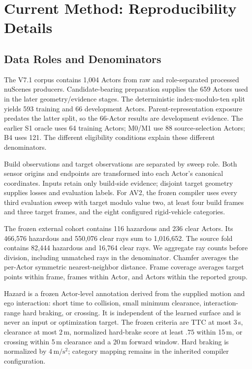\section{Current Method: Reproducibility Details}
\label{sec:archive-repro}

\subsection{Data Roles and Denominators}

The V7.1 corpus contains 1,004 Actors from raw and role-separated processed nuScenes producers.
Candidate-bearing preparation supplies the 659 Actors used in the later geometry/evidence stages.
The deterministic index-modulo-ten split yields 593 training and 66 development Actors.
Parent-representation exposure predates the latter split, so the 66-Actor results are development evidence.
The earlier S1 oracle uses 64 training Actors; M0/M1 use 88 source-selection Actors; B4 uses 121.
The different eligibility conditions explain these different denominators.

Build observations and target observations are separated by sweep role. Both sensor origins and endpoints
are transformed into each Actor's canonical coordinates.
Inputs retain only build-side evidence; disjoint target geometry supplies losses and evaluation labels.
For AV2, the frozen compiler uses every third evaluation sweep with target modulo value two,
at least four build frames and three target frames, and the eight configured rigid-vehicle categories.

The frozen external cohort contains 116 hazardous and 236 clear Actors.
Its 466,576 hazardous and 550,076 clear rays sum to 1,016,652.
The source fold contains 82,444 hazardous and 16,764 clear rays.
We aggregate ray counts before division, including unmatched rays in the denominator.
Chamfer averages the per-Actor symmetric nearest-neighbor distance.
Frame coverage averages target points within frame, frames within Actor, and Actors within the reported group.

Hazard is a frozen Actor-level annotation derived from the supplied motion and ego interaction:
short time to collision, small minimum clearance, interaction-range hard braking, or crossing.
It is independent of the learned surface and is never an input or optimization target.
The frozen criteria are TTC at most 3\,s, clearance at most 2\,m, normalized hard-brake score at least
$.75$ within 15\,m, or crossing within 5\,m clearance and a 20\,m forward window.
Hard braking is normalized by $4\,\mathrm{m/s^2}$; category mapping remains in the inherited compiler configuration.

